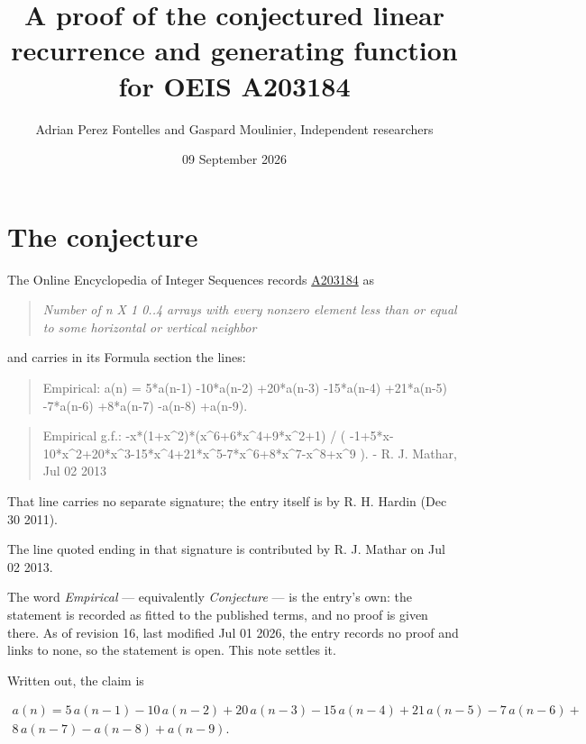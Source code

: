 \documentclass[11pt]{article}
\title{A proof of the conjectured linear recurrence and generating function for OEIS A203184}
\author{Adrian Perez Fontelles and Gaspard Moulinier, Independent researchers}
\date{09 September 2026}
\theoremstyle{definition}
\begin{document}
\maketitle
\section{The conjecture}

The Online Encyclopedia of Integer Sequences records \href{https://oeis.org/A203184}{A203184} as

\begin{quote}\itshape Number of n X 1 0..4 arrays with every nonzero element less than or equal to some horizontal or vertical neighbor\end{quote}

and carries in its Formula section the lines:

\begin{quote}\ttfamily Empirical: a(n) = 5*a(n-1) -10*a(n-2) +20*a(n-3) -15*a(n-4) +21*a(n-5) -7*a(n-6) +8*a(n-7) -a(n-8) +a(n-9).\end{quote}

\begin{quote}\ttfamily Empirical g.f.: -x*(1+x\textasciicircum{}2)*(x\textasciicircum{}6+6*x\textasciicircum{}4+9*x\textasciicircum{}2+1) / ( -1+5*x-10*x\textasciicircum{}2+20*x\textasciicircum{}3-15*x\textasciicircum{}4+21*x\textasciicircum{}5-7*x\textasciicircum{}6+8*x\textasciicircum{}7-x\textasciicircum{}8+x\textasciicircum{}9 ). - R. J. Mathar, Jul 02 2013\end{quote}

That line carries no separate signature; the entry itself is by R. H. Hardin (Dec 30 2011).

The line quoted ending in that signature is contributed by R. J. Mathar on Jul 02 2013.

The word {\itshape Empirical} --- equivalently {\itshape Conjecture} --- is the entry's own: the statement is recorded as fitted to the published terms, and no proof is given there. As of revision 16, last modified Jul 01 2026, the entry records no proof and links to none, so the statement is open. This note settles it.

Written out, the claim is

\begin{multline*} a(n) = 5\,a(n-1) - 10\,a(n-2) + 20\,a(n-3) - 15\,a(n-4) + 21\,a(n-5) - 7\,a(n-6) + \\ 8\,a(n-7) - a(n-8) + a(n-9). \end{multline*}
\end{document}
